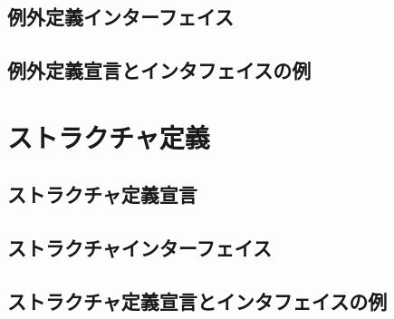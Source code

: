 \documentclass{jbook}
\newif\ifjp
\newcommand{\txt}[2]{#1}
\begin{document}
\subsection{\txt{例外定義インターフェイス}{}}
\ifjp%
\else%
\fi%

\subsection{\txt{例外定義宣言とインタフェイスの例}{}}
\ifjp%
\else%
\fi%

\section{\txt{ストラクチャ定義}{}}
\ifjp%
\else%
\fi%

\subsection{\txt{ストラクチャ定義宣言}{}}
\ifjp%
\else%
\fi%

\subsection{\txt{ストラクチャインターフェイス}{}}
\ifjp%
\else%
\fi%

\subsection{\txt{ストラクチャ定義宣言とインタフェイスの例}{}}
\ifjp%
\else%
\fi%
\end{document}
